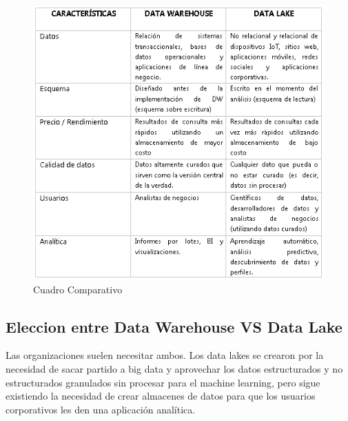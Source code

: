 \documentclass[11pt,a4paper]{article}
\begin{document}
		\begin{figure}[H]
			\begin{center}
				\includegraphics[scale=0.9]{./Imagenes/imgComparativo}
				\caption{Cuadro Comparativo}		
			\end{center}
		\end{figure}
		
		\subsection{Eleccion entre Data Warehouse VS Data Lake}
		
		Las organizaciones suelen necesitar ambos. Los data lakes se crearon por la necesidad de sacar partido a big data y aprovechar los datos estructurados y no estructurados granulados sin procesar para el machine learning, pero sigue existiendo la necesidad de crear almacenes de datos para que los usuarios corporativos les den una aplicación analítica.
		
\end{document}
